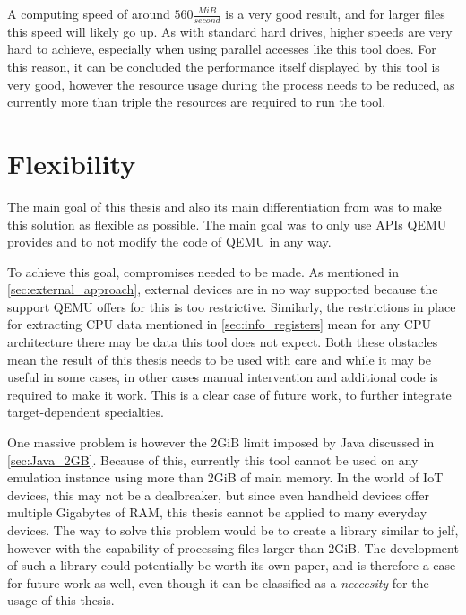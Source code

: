 A computing speed of around $560\frac{MiB}{second}$ is a very good result,
and for larger files this speed will likely go up.
As with standard hard drives, higher speeds are very hard to achieve,
especially when using parallel accesses like this tool does.
For this reason, it can be concluded the performance itself displayed by this tool is very good,
however the resource usage during the process needs to be reduced,
as currently more than triple the resources are required to run the tool.

\section{Flexibility}\label{sec:eval_flexibility}
The main goal of this thesis and also its main differentiation from \citeauthor{kitcheckpoints}
was to make this solution as flexible as possible.
The main goal was to only use APIs QEMU provides
and to not modify the code of QEMU in any way.

To achieve this goal, compromises needed to be made.
As mentioned in \autoref{sec:external_approach}, external devices are in no way supported because the support QEMU offers for this is too restrictive.
Similarly, the restrictions in place for extracting CPU data mentioned in \autoref{sec:info_registers} mean for any CPU architecture there may be data this tool does not expect.
Both these obstacles mean the result of this thesis needs to be used with care
and while it may be useful in some cases, in other cases manual intervention and additional code is required to make it work.
This is a clear case of future work, to further integrate target-dependent specialties.

One massive problem is however the 2GiB limit imposed by Java discussed in \autoref{sec:Java_2GB}.
Because of this, currently this tool cannot be used on any emulation instance using more than 2GiB of main memory.
In the world of IoT devices, this may not be a dealbreaker, but since even handheld devices offer multiple Gigabytes of RAM,
this thesis cannot be applied to many everyday devices.
The way to solve this problem would be to create a library similar to jelf\cite{jelf},
however with the capability of processing files larger than 2GiB.
The development of such a library could potentially be worth its own paper,
and is therefore a case for future work as well,
even though it can be classified as a \emph{neccesity} for the usage of this thesis.


